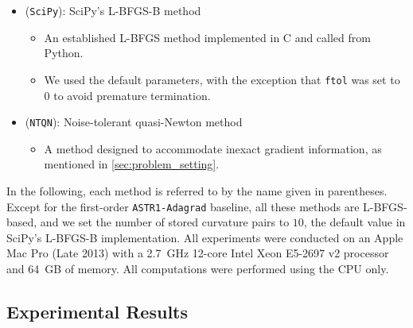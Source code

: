 \documentclass[journal_revised_MPC]{subfiles}
\begin{document}
\begin{itemize}
    \item (\texttt{SciPy}): SciPy's L-BFGS-B method~\citep{2020SciPy-NMeth}
          \begin{itemize}
              \item An established L-BFGS method implemented in C and called from Python.
              \item We used the default parameters, with the exception that \texttt{ftol} was set to $0$ to avoid premature termination.
          \end{itemize}

    \item (\texttt{NTQN}): Noise-tolerant quasi-Newton method~\citep{xieAnalysisBFGSMethod2020,shiNoiseTolerantQuasiNewtonAlgorithm2022}
          \begin{itemize}
              \item A method designed to accommodate inexact gradient information, as mentioned in \cref{sec:problem_setting}.
          \end{itemize}

\end{itemize}

In the following, each method is referred to by the name given in parentheses.
Except for the first-order \texttt{ASTR1-Adagrad} baseline, all these methods are L-BFGS-based, and we set the number of stored curvature pairs to $10$, the default value in SciPy's L-BFGS-B implementation.
All experiments were conducted on an Apple Mac Pro (Late 2013) with a 2.7~GHz 12-core Intel Xeon E5-2697 v2 processor and 64~GB of memory. %
All computations were performed using the CPU only.

\subsection{Experimental Results}\label{sec:results}
\end{document}

